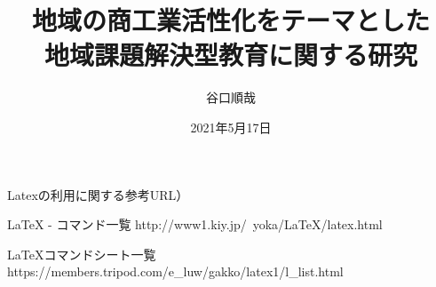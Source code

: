 \documentclass[chukan]{hitsotsuron} %
\title{地域の商工業活性化をテーマとした\\地域課題解決型教育に関する研究}
\author{谷口順哉}
\date{2021年5月17日}
\begin{document}

\twocolumn[%
\maketitle
]


Latexの利用に関する参考URL）

LaTeX - コマンド一覧
http://www1.kiy.jp/~yoka/LaTeX/latex.html

LaTeXコマンドシート一覧
https://members.tripod.com/e_luw/gakko/latex1/l_list.html

\fi









\end{document}
